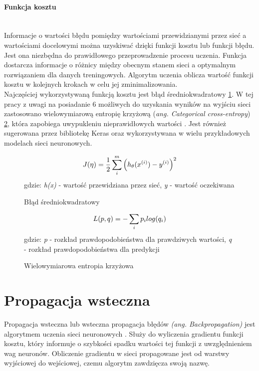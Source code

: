 \paragraph{Funkcja kosztu} \mbox{}\\
Informacje o wartości błędu pomiędzy wartościami przewidzianymi przez sieć
a wartościami docelowymi można uzyskiwać dzięki funkcji kosztu lub funkcji błędu.
Jest ona niezbędna do prawidłowego przeprowadzenie procesu uczenia.
Funkcja dostarcza informacje o różnicy między obecnym stanem sieci a optymalnym
rozwiązaniem dla danych treningowych. Algorytm uczenia
oblicza wartość funkcji kosztu w kolejnych krokach w celu jej zminimalizowania.\\
Najczęściej wykorzystywaną funkcją kosztu jest błąd średniokwadratowy \ref{eq:mse}.
W tej pracy z uwagi na posiadanie 6 możliwych do uzyskania wyników na wyjściu sieci
zastosowano wielowymiarową entropię krzyżową (\textit{ang. Categorical cross-entropy}) \ref{eq:categorical-crossentropy},
która zapobiega uwypukleniu nieprawidłowych wartości \cite{whyNotMSE}. Jest również
sugerowana przez bibliotekę Keras oraz wykorzystywana w wielu przykładowych modelach sieci neuronowych.
\begin{figure}[h!]
\renewcommand{\figurename}{Wzór}%
\begin{equation*}
J(\eta) = \frac {1}{2} \sum_{i}^{m} \Big(h_{\theta}(x^{(i)}) - y^{(i)} \Big)^2\\
\end{equation*}
\centering
gdzie: \textit{h\textsubscript{\straighttheta}(x)} - wartość przewidziana przez sieć, \textit{y} - wartość oczekiwana
\caption{Błąd średniokwadratowy}
\label{eq:mse}
\end{figure}
\begin{figure}[h!]
\renewcommand{\figurename}{Wzór}%
\begin{equation*}
L(p, q) = - \sum_{i} p_{i} log(q_{i})\\
\end{equation*}
\centering
gdzie: \textit{p} - rozkład prawdopodobieństwa dla prawdziwych wartości, \textit{q} - rozkład prawdopodobieństwa dla predykcji
\caption{Wielowymiarowa entropia krzyżowa}
\label{eq:categorical-crossentropy}
\end{figure}

\section{Propagacja wsteczna}
Propagacja wsteczna lub wsteczna propagacja błędów \textit{(ang. Backpropagation)}
jest algorytmem uczenia sieci neuronowych \cite{CS231n_backprop, backprop}.
Służy do wyliczenia gradientu funkcji kosztu, który informuje o szybkości spadku wartości tej funkcji
z uwzględnieniem wag neuronów. Obliczenie gradientu w sieci propagowane
jest od warstwy wyjściowej do wejściowej, czemu algorytm zawdzięcza swoją nazwę.

